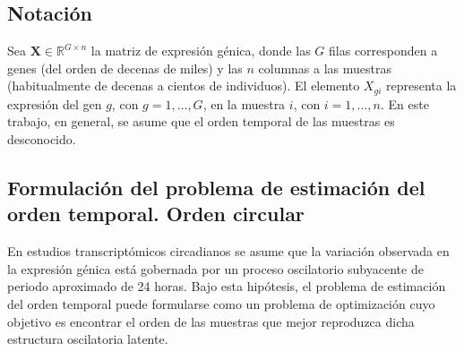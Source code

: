 \documentclass[12pt, a4paper]{report}
\begin{document}
\subsection{Notación}
\label{sec:notacion}

Sea \(\mathbf{X}\in\mathbb{R}^{G\times n}\) la matriz de expresión génica, donde las \(G\) filas corresponden a genes (del orden de decenas de miles) y las \(n\) columnas a las muestras (habitualmente de decenas a cientos de individuos). El elemento \(X_{gi}\) representa la expresión del gen \(g\), con \(g=1,\ldots,G\), en la muestra \(i\), con \(i=1,\ldots,n\). En este trabajo, en general, se asume que el orden temporal de las muestras es desconocido.

\subsection{Formulación del problema de estimación del orden temporal. Orden circular}
\label{sec:formulacion}

En estudios transcriptómicos circadianos se asume que la variación observada en la expresión génica está gobernada por un proceso oscilatorio subyacente de periodo aproximado de 24 horas. Bajo esta hipótesis, el problema de estimación del orden temporal puede formularse como un problema de optimización cuyo objetivo es encontrar el orden de las muestras que mejor reproduzca dicha estructura oscilatoria latente.
\end{document}
